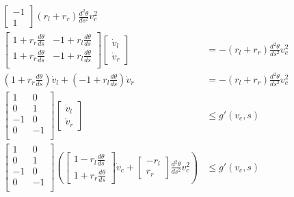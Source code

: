 \documentclass{article}
\begin{document}
\begin{align}
  \begin{bmatrix} -1 \\ 1 \end{bmatrix} (r_l + r_r) \frac{d^2\theta}{ds^2} v_c^2 \\
\begin{bmatrix}
1 + r_r \frac{d\theta}{ds} & -1 + r_l \frac{d\theta}{ds} \\
1 + r_r \frac{d\theta}{ds} & -1 + r_l \frac{d\theta}{ds} \\
\end{bmatrix}
\begin{bmatrix} \dot{v}_l \\ \dot{v}_r \end{bmatrix} &=
   -(r_l + r_r) \frac{d^2\theta}{ds^2} v_c^2 \\
(1 + r_r \frac{d\theta}{ds}) \dot{v}_l + (-1 + r_l \frac{d\theta}{ds}) \dot{v}_r &=
   -(r_l + r_r) \frac{d^2\theta}{ds^2} v_c^2 \\
\begin{bmatrix}
1 & 0 \\
0 & 1 \\
-1 & 0 \\
0 & -1 \\
\end{bmatrix}
\begin{bmatrix} \dot{v}_l \\ \dot{v}_r \end{bmatrix} &\le g'(v_c, s) \\
\begin{bmatrix}
1 & 0 \\
0 & 1 \\
-1 & 0 \\
0 & -1 \\
\end{bmatrix} \left(
\begin{bmatrix} 1 - r_l \frac{d\theta}{ds} \\ 1 + r_r \frac{d\theta}{ds}
\end{bmatrix} \dot{v}_c +   \begin{bmatrix} -r_l \\ r_r \end{bmatrix} \frac{d^2\theta}{ds^2} v_c^2
\right) &\le g'(v_c, s)
\end{align}
\end{document}
